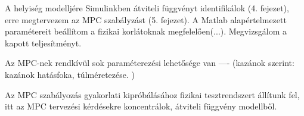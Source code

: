 

A helyiség modelljére Simulinkben átviteli függvényt identifikálok (4. fejezet), erre megtervezem az MPC szabályzást (5. fejezet). A Matlab alapértelmezett paramétereit beállítom a fizikai korlátoknak megfelelően(...). Megvizsgálom a kapott teljesítményt.

Az MPC-nek rendkívül sok paraméterezési lehetősége van ---- (kazánok \cite[235.~o.]{Herz} szerint: kazánok hatásfoka, túlméretezése. )

Az MPC szabályozás gyakorlati kipróbálásához fizikai tesztrendszert állítunk fel, itt az MPC tervezési kérdésekre koncentrálok, átviteli függvény modellből.














